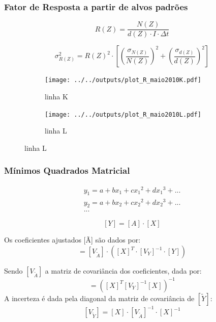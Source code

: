 \begin{frame}
  \frametitle{Fator de Resposta a partir de alvos padrões}
  \begin{footnotesize}
  \begin{equation*}
    R(Z) = \frac{N(Z)}{d(Z) \cdot I \cdot \Delta t}
  \end{equation*}
    
  \begin{equation*}
  \sigma_{R(Z)}^2 = {R(Z)}^2 \cdot \left[ \left(\frac{\sigma_{N(Z)}}{N(Z)}\right)^2 + 
  \left(\frac{\sigma_{d(Z)}}{d(Z)}\right)^2 
  \right]
  \end{equation*}
\end{footnotesize}  
  \begin{figure}[H]
  	\begin{subfigure}[b]{0.4\textwidth}
  		\texttt{[image: ../../outputs/plot\_R\_maio2010K.pdf]}
  		\caption{linha K}
  	\end{subfigure}%
  	\begin{subfigure}[b]{0.4\textwidth}
  		\texttt{[image: ../../outputs/plot\_R\_maio2010L.pdf]}
  		\caption{linha L}
  	\end{subfigure}
  \end{figure}
\end{frame}

\begin{frame}
  \frametitle{Mínimos Quadrados Matricial} 
\begin{equation*}
  \label{eq:polinomio}
  \begin{split}
    y_1 = a + b x_1 + c{x_1}^2 + d{x_1}^3 + ...\\
    y_2 = a + b x_2 + c{x_2}^2 + d{x_2}^3 + ... \\
    ...
  \end{split}
\end{equation*}

\begin{equation*}
  \label{eq:polinomioMatriz}
  [Y] = [A] \cdot [X]
\end{equation*}

Os coeficientes ajustados [Ã] são dados por:
\begin{equation*}
  [\tilde{A}] = [V_{\tilde{A}}] \cdot ([X]^T \cdot {[V_Y]}^{-1} \cdot [Y])
\end{equation*}

Sendo $[V_{\tilde{A}}]$ a matriz de covariância dos coeficientes, dada por:
\begin{equation*}
  [V_{\tilde{A}}] = ([X]^T [V_Y]^{-1} [X])^{-1}
\end{equation*}
A incerteza é dada pela diagonal da matriz de covariância de $[\tilde{Y}]$:
\begin{equation*}
\label{eq:matrizcovarianciaY}
[V_{\tilde{Y}}] = [X] \cdot [V_{\tilde{A}}]^{-1} \cdot [X]^{-1}
\end{equation*}
\end{frame}

